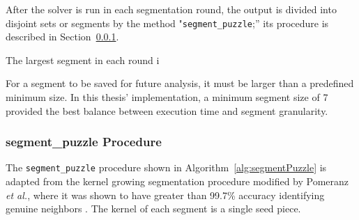 After the solver is run in each segmentation round, the output is divided into disjoint sets or segments by the method "\texttt{segment\_puzzle};'' its procedure is described in Section~\ref{sec:segmentPuzzle}.

The largest segment in each round i

For a segment to be saved for future analysis, it must be larger than a predefined minimum size.  In this thesis' implementation, a minimum segment size of 7 provided the best balance between execution time and segment granularity.

\subsubsection{{segment\_puzzle} Procedure}\label{sec:segmentPuzzle}

The \texttt{segment\_puzzle} procedure shown in Algorithm~\ref{alg:segmentPuzzle} is adapted from the kernel growing segmentation procedure modified by Pomeranz \textit{et al.}, where it was shown to have greater than 99.7\% accuracy identifying genuine neighbors \cite{pomeranz2011}. The kernel of each segment is a single seed piece.

